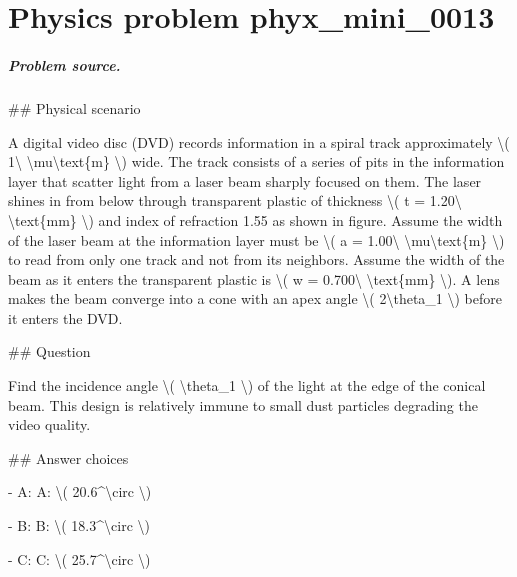 
\chapter{Physics problem phyx\_mini\_0013}
\label{ch:PhyXMiniProblems_problem_phyx_mini_0013}

\paragraph{Problem source.}
\#\# Physical scenario

A digital video disc (DVD) records information in a spiral track approximately \textbackslash{}( 1\textbackslash{} \textbackslash{}mu\textbackslash{}text\{m\} \textbackslash{}) wide. The track consists of a series of pits in the information layer that scatter light from a laser beam sharply focused on them. The laser shines in from below through transparent plastic of thickness \textbackslash{}( t = 1.20\textbackslash{} \textbackslash{}text\{mm\} \textbackslash{}) and index of refraction 1.55 as shown in figure. Assume the width of the laser beam at the information layer must be \textbackslash{}( a = 1.00\textbackslash{} \textbackslash{}mu\textbackslash{}text\{m\} \textbackslash{}) to read from only one track and not from its neighbors. Assume the width of the beam as it enters the transparent plastic is \textbackslash{}( w = 0.700\textbackslash{} \textbackslash{}text\{mm\} \textbackslash{}). A lens makes the beam converge into a cone with an apex angle \textbackslash{}( 2\textbackslash{}theta\_1 \textbackslash{}) before it enters the DVD.

\#\# Question

Find the incidence angle \textbackslash{}( \textbackslash{}theta\_1 \textbackslash{}) of the light at the edge of the conical beam. This design is relatively immune to small dust particles degrading the video quality.

\#\# Answer choices

- A: A: \textbackslash{}( 20.6\textasciicircum{}\textbackslash{}circ \textbackslash{})

- B: B: \textbackslash{}( 18.3\textasciicircum{}\textbackslash{}circ \textbackslash{})

- C: C: \textbackslash{}( 25.7\textasciicircum{}\textbackslash{}circ \textbackslash{})

